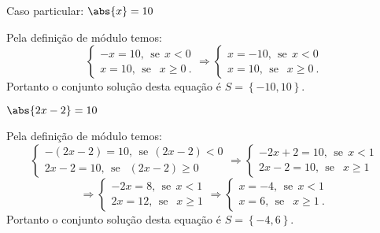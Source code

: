 \begin{exem}
  Caso particular: $\abs{x}= 10$

  Pela definição de módulo temos:
  \[
  \begin{cases}
      -x= 10, \ \ \text{se} \ \ x<0 \\
      x= 10, \ \ \text{se } \ \ x \geq 0 \ .
     \end{cases}
     \Rightarrow
     \begin{cases}
      x= -10, \ \ \text{se} \ \ x<0 \\
      x= 10, \ \ \text{se } \ \ x \geq 0 \ .
     \end{cases}
  \]
 Portanto o conjunto solução desta equação é $S= \left\{-10, 10 \right\}$.
\end{exem}

\begin{exem}
 $\abs{2x-2}= 10$

  Pela definição de módulo temos:
  \[
  \begin{cases}
      -(2x-2)= 10, \ \ \text{se} \ \ (2x-2)<0 \\
      2x-2= 10, \ \ \text{se } \ \ (2x-2) \geq 0
     \end{cases}
     \Rightarrow
     \begin{cases}
      -2x + 2= 10, \ \ \text{se} \ \ x< 1 \\
      2x - 2= 10, \ \ \text{se } \ \ x \geq 1
     \end{cases}
     \]
     \[
     \Rightarrow
     \begin{cases}
      -2x= 8, \ \ \text{se} \ \ x< 1 \\
       2x= 12, \ \ \text{se } \ \ x \geq 1
     \end{cases}
     \Rightarrow
     \begin{cases}
      x= -4, \ \ \text{se} \ \ x< 1 \\
      x= 6, \ \ \text{se } \ \ x \geq 1 \ .
     \end{cases}
  \]
  Portanto o conjunto solução desta equação é $S= \left\{-4, 6 \right\}$.
 \end{exem}
 
